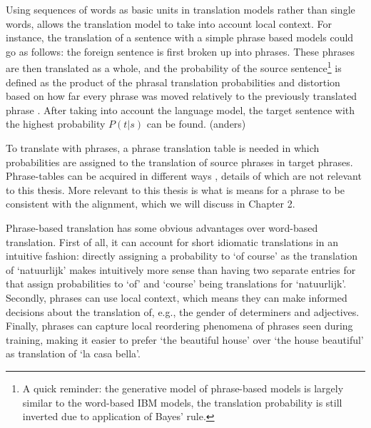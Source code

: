 \documentclass{report}
\theoremstyle{definition}
\theoremstyle{plain}
\begin{document}
Using sequences of words as basic units in translation models rather than single words, allows the translation model to take into account local context. For instance, the translation of a sentence with a simple phrase based models could go as follows: the foreign sentence is first broken up into phrases. These phrases are then translated as a whole, and the probability of the source sentence\footnote{A quick reminder: the generative model of phrase-based models is largely similar to the word-based IBM models, the translation probability is still inverted due to application of Bayes' rule.} is defined as the product of the phrasal translation probabilities and distortion based on how far every phrase was moved relatively to the previously translated phrase \citep{koehn2003statistical}. After taking into account the language model, the target sentence with the highest probability $P(t|s)$ can be found. (anders)

To translate with phrases, a phrase translation table is needed in which probabilities are assigned to the translation of source phrases in target phrases. Phrase-tables can be acquired in different ways \citep{marcu2002phrase,och1999improved,koehn2003statistical}, details of which are not relevant to this thesis. More relevant to this thesis is what is means for a phrase to be consistent with the alignment, which we will discuss in Chapter 2.

Phrase-based translation has some obvious advantages over word-based translation. First of all, it can account for short idiomatic translations in an intuitive fashion: directly assigning a probability to `of course' as the translation of `natuurlijk' makes intuitively more sense than having two separate entries for that assign probabilities to `of' and `course' being translations for `natuurlijk'. Secondly, phrases can use local context, which means they can make informed decisions about the translation of, e.g., the gender of determiners and adjectives. Finally, phrases can capture local reordering phenomena of phrases seen during training, making it easier to prefer `the beautiful house' over `the house beautiful' as translation of `la casa bella'.
\end{document}
